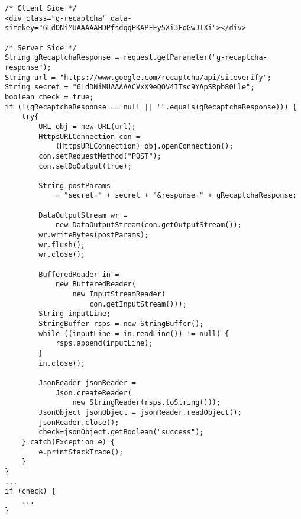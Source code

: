 \begin{lstlisting}
/* Client Side */
<div class="g-recaptcha" data-sitekey="6LdDNiMUAAAAAHDPfsdqqPKAPFEy5Xi3EoGwJIXi"></div>

/* Server Side */
String gRecaptchaResponse = request.getParameter("g-recaptcha-response");
String url = "https://www.google.com/recaptcha/api/siteverify";
String secret = "6LdDNiMUAAAAACVxX9eQOV4ITsc9YApSRpb80Lle";
boolean check = true;
if (!(gRecaptchaResponse == null || "".equals(gRecaptchaResponse))) {
	try{
		URL obj = new URL(url);
		HttpsURLConnection con =
			(HttpsURLConnection) obj.openConnection();
		con.setRequestMethod("POST");
		con.setDoOutput(true);

		String postParams
			= "secret=" + secret + "&response=" + gRecaptchaResponse;

		DataOutputStream wr =
			new DataOutputStream(con.getOutputStream());
		wr.writeBytes(postParams);
		wr.flush();
		wr.close();

		BufferedReader in =
			new BufferedReader(
				new InputStreamReader(
					con.getInputStream()));
		String inputLine;
		StringBuffer rsps = new StringBuffer();
		while ((inputLine = in.readLine()) != null) {
			rsps.append(inputLine);
		}
		in.close();

		JsonReader jsonReader =
			Json.createReader(
				new StringReader(rsps.toString()));
		JsonObject jsonObject = jsonReader.readObject();
		jsonReader.close();
		check=jsonObject.getBoolean("success");
	} catch(Exception e) {
		e.printStackTrace();
	}
}
...
if (check) {
	...
}
\end{lstlisting}

